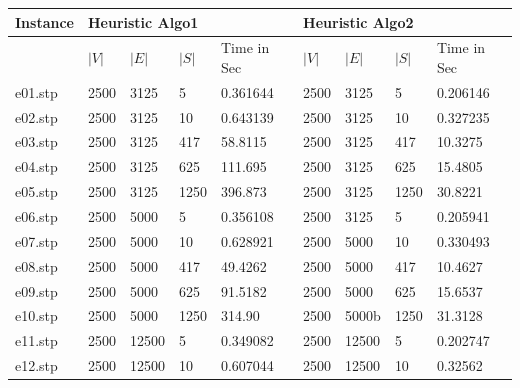 \begin{table}[ht]
\label{my-label}
\begin{center}
\begin{tabular}{|l|l|l|l|l|l|l|l|l|}
\hline
Instance & \multicolumn{4}{l|}{Heuristic Algo1} & \multicolumn{4}{l|}{Heuristic Algo2} \\ \hline
         & $|V|$      & $|E|$      & $|S|$      & Time in Sec     & $|V|$      & $|E|$      & $|S|$     & Time in Sec     \\ \hline
 e01.stp &  2500      &  3125      &   5        &  0.361644       &  2500      &  3125      &   5       &  0.206146       \\ \hline
 e02.stp &  2500      &  3125      &  10        &  0.643139       &  2500      &  3125      &  10       &  0.327235       \\ \hline
 e03.stp &  2500      &  3125      &  417       &  58.8115        &  2500      &  3125      &  417      &  10.3275        \\ \hline
 e04.stp &  2500      &  3125      &  625       &  111.695        &  2500      &  3125      &  625      &  15.4805        \\ \hline
 e05.stp &  2500      &  3125      &  1250      &  396.873        &  2500      &  3125      &  1250     &  30.8221        \\ \hline
 e06.stp &  2500      &  5000      &  5         &  0.356108       &  2500      &  3125      &  5        &  0.205941       \\ \hline
 e07.stp &  2500      &  5000      &  10        &  0.628921       &  2500      &  5000      &  10       &  0.330493       \\ \hline
 e08.stp &  2500      &  5000      &  417       &  49.4262        &  2500      &  5000      &  417      &  10.4627        \\ \hline
 e09.stp &  2500      &  5000      &  625       &  91.5182        &  2500      &  5000      &  625      &  15.6537        \\ \hline
 e10.stp &  2500      &  5000      &  1250      &  314.90         &  2500      &  5000b     &  1250     &  31.3128        \\ \hline
 e11.stp &  2500      &  12500     &  5         &  0.349082       &  2500      &  12500     &  5        &  0.202747       \\ \hline
 e12.stp &  2500      &  12500     &  10        &  0.607044       &  2500      &  12500     &  10       &  0.32562        \\ \hline

\end{tabular}
\end{center}
\end{table}
